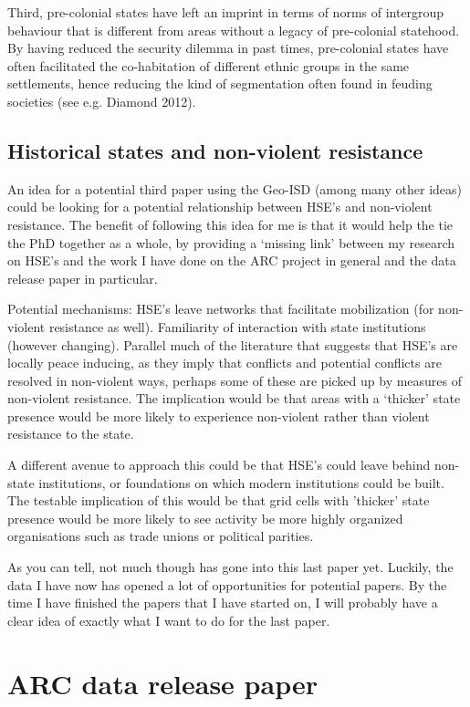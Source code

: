 \documentclass[12pt]{article}
\begin{document}
Third, pre-colonial states have left an imprint in terms of norms of intergroup
behaviour that is different from areas without a legacy of pre-colonial
statehood. By having reduced the security dilemma in past times, pre-colonial
states have often facilitated the co-habitation of different ethnic groups in
the same settlements, hence reducing the kind of segmentation often found in
feuding societies (see e.g. Diamond 2012).

\subsection{Historical states and non-violent resistance}

An idea for a potential third paper using the Geo-ISD (among many other ideas)
could be looking for a potential relationship between HSE's and non-violent
resistance. The benefit of following this idea for me is that it would help the
tie the PhD together as a whole, by providing a `missing link' between my
research on HSE's and the work I have done on the ARC project in general and the
data release paper in particular.

Potential mechanisms: HSE's leave networks that facilitate mobilization (for
non-violent resistance as well). Familiarity of interaction with state
institutions (however changing). Parallel much of the literature that suggests
that HSE's are locally peace inducing, as they imply that conflicts and
potential conflicts are resolved in non-violent ways, perhaps some of these are
picked up by measures of non-violent resistance. The implication would be that
areas with a `thicker' state presence would be more likely to experience
non-violent rather than violent resistance to the state.

A different avenue to approach this could be that HSE's could leave behind
non-state institutions, or foundations on which modern institutions could be
built. The testable implication of this would be that grid cells with 'thicker'
state presence would be more likely to see activity be more highly organized
organisations such as trade unions or political parities.

As you can tell, not much though has gone into this last paper yet. Luckily, the
data I have now has opened a lot of opportunities for potential papers. By the
time I have finished the papers that I have started on, I will probably have a
clear idea of exactly what I want to do for the last paper.

\section{ARC data release paper}
\end{document}
